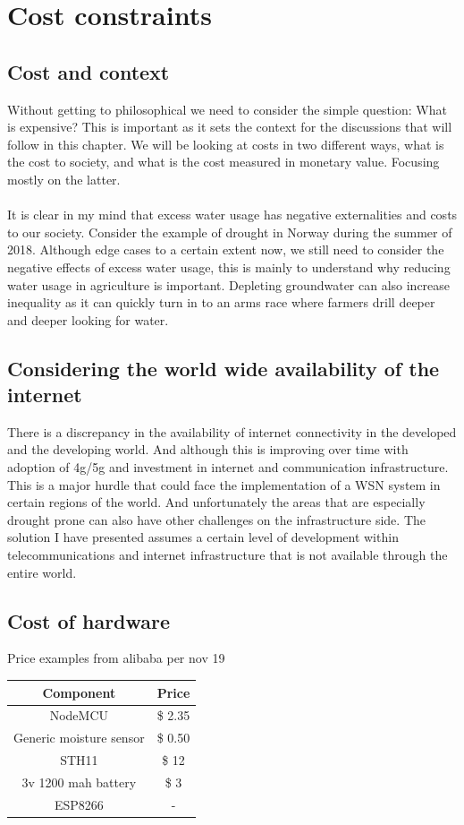 \documentclass[]{uiophd}
\begin{document}
\chapter{Cost constraints}

\section{Cost and context}
Without getting to philosophical we need to consider the simple question: What is expensive? This is important as it sets the context for the discussions that will follow in this chapter. We will be looking at costs in two different ways, what is the cost to society, and what is the cost measured in monetary value. Focusing mostly on the latter. 
\\\\
It is clear in my mind that excess water usage has negative externalities and costs to our society. Consider the  example of drought in Norway during the summer of 2018. Although edge cases to a certain extent now, we still need to consider the negative effects of excess water usage, this is mainly to understand why reducing water usage in agriculture is important. Depleting groundwater can also increase inequality as it can quickly turn in to an arms race where farmers drill deeper and deeper looking for water.
\section{Considering the world wide availability of the internet}
There is a discrepancy in the availability of internet connectivity in the developed and the developing world. And although this is improving over time with adoption of 4g/5g and investment in internet and communication infrastructure. This is a major hurdle that could face the implementation of a WSN system in certain regions of the world. And unfortunately the areas that are especially drought prone can also have other challenges on the infrastructure side. The solution I have presented assumes a certain level of development within telecommunications and internet infrastructure that is not available through the entire world.
\section{Cost of hardware}

Price examples from alibaba per nov 19

\begin{center}
 \begin{tabular}{||c | c||} 
 \hline
 Component & Price \\ [0.5ex] 
 \hline\hline
 NodeMCU & \$ 2.35 \\ 
 \hline
 Generic moisture sensor & \$ 0.50 \\
 \hline
 STH11 & \$ 12 \\
 \hline
 3v 1200 mah battery & \$ 3 \\
 \hline
 ESP8266 & - \\ [1ex] 
 \hline
\end{tabular}
\end{center}
\end{document}
